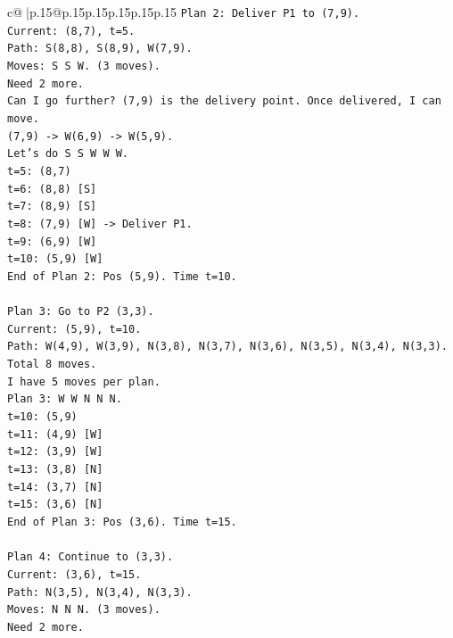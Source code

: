 \documentclass{article}
\begin{document}
{\begin{supertabular}{c@{$\;$}|p{.15\linewidth}@{}p{.15\linewidth}p{.15\linewidth}p{.15\linewidth}p{.15\linewidth}p{.15\linewidth}}
{{{\texttt{Plan 2: Deliver P1 to (7,9).} \\
\texttt{Current: (8,7), t=5.} \\
\texttt{Path: S(8,8), S(8,9), W(7,9).} \\
\texttt{Moves: S S W. (3 moves).} \\
\texttt{Need 2 more.} \\
\texttt{Can I go further? (7,9) is the delivery point. Once delivered, I can move.} \\
\texttt{(7,9) {-}> W(6,9) {-}> W(5,9).} \\
\texttt{Let's do S S W W W.} \\
\texttt{t=5: (8,7)} \\
\texttt{t=6: (8,8) {[}S{]}} \\
\texttt{t=7: (8,9) {[}S{]}} \\
\texttt{t=8: (7,9) {[}W{]} {-}> Deliver P1.} \\
\texttt{t=9: (6,9) {[}W{]}} \\
\texttt{t=10: (5,9) {[}W{]}} \\
\texttt{End of Plan 2: Pos (5,9). Time t=10.} \\
\\ 
\texttt{Plan 3: Go to P2 (3,3).} \\
\texttt{Current: (5,9), t=10.} \\
\texttt{Path: W(4,9), W(3,9), N(3,8), N(3,7), N(3,6), N(3,5), N(3,4), N(3,3).} \\
\texttt{Total 8 moves.} \\
\texttt{I have 5 moves per plan.} \\
\texttt{Plan 3: W W N N N.} \\
\texttt{t=10: (5,9)} \\
\texttt{t=11: (4,9) {[}W{]}} \\
\texttt{t=12: (3,9) {[}W{]}} \\
\texttt{t=13: (3,8) {[}N{]}} \\
\texttt{t=14: (3,7) {[}N{]}} \\
\texttt{t=15: (3,6) {[}N{]}} \\
\texttt{End of Plan 3: Pos (3,6). Time t=15.} \\
\\ 
\texttt{Plan 4: Continue to (3,3).} \\
\texttt{Current: (3,6), t=15.} \\
\texttt{Path: N(3,5), N(3,4), N(3,3).} \\
\texttt{Moves: N N N. (3 moves).} \\
\texttt{Need 2 more.} \\
}}}
\end{supertabular}}
\end{document}
